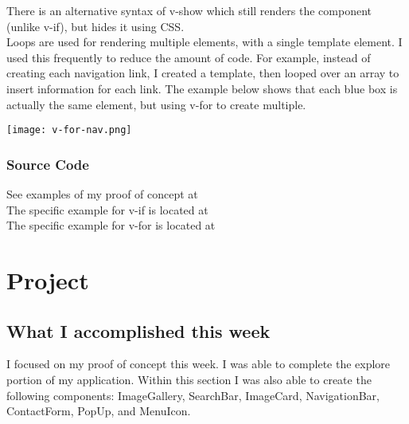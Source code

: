 \documentclass[portfolio.tex]{subfiles}
\begin{document}
				\bigbreak
				There is an alternative syntax of v-show which still renders the component (unlike v-if), but hides it using CSS.\\

				Loops are used for rendering multiple elements, with a single template element. I used this frequently to reduce the amount of code. For example, instead of creating each navigation link, I created a template, then looped over an array to insert information for each link. The example below shows that each blue box is actually the same element, but using v-for to create multiple.\\

				\begin{center}
					\texttt{[image: v-for-nav.png]}
				\end{center}

				\subsubsection{Source Code}

				\noindent See examples of my proof of concept at \\

				\noindent The specific example for v-if is located at \\

				\noindent The specific example for v-for is located at 
		\section{Project}
			\subsection{What I accomplished this week}

				I focused on my proof of concept this week. I was able to complete the explore portion of my application. Within this section I was also able to create the following components: ImageGallery, SearchBar, ImageCard, NavigationBar, ContactForm, PopUp, and MenuIcon. \\
\end{document}
